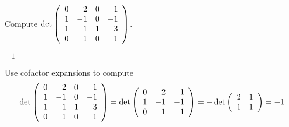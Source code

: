 \documentclass{ximera}
\author{Marty Golubitsky}
\begin{document}

\begin{exercise}\label{c10.1.5c}

Compute \quad $\det\left(\begin{array}{rrrrrrrrrrrrrrrrrr} 0 & 2 & 0 & 1\\ 1 & -1 & 0 & -1\\ 1 & 1 & 1& 3\\ 0 & 1 & 0 & 1 \end{array}\right)$.
  
\begin{solution}

\ans $-1$

\soln Use cofactor expansions to compute
\[
\det\left(\begin{array}{rrrrrrrrrrrrrrrrrr} 0 & 2 & 0 & 1\\ 1 & -1 & 0 & -1\\ 1 & 1 & 1& 3\\ 0 & 1 & 0 & 1 \end{array}\right) = 
\det\left(\begin{array}{rrrrrrrrrrrrrrrrrr} 0 & 2 & 1\\ 1 & -1 &  -1\\  0& 1 & 1 \end{array}\right) = -\det\left(\begin{array}{rrrrrrrrrrrrrrrrrr} 2 & 1\\ 1 & 1 \end{array}\right) = -1
\]

\end{solution}
\end{exercise}
\end{document}
